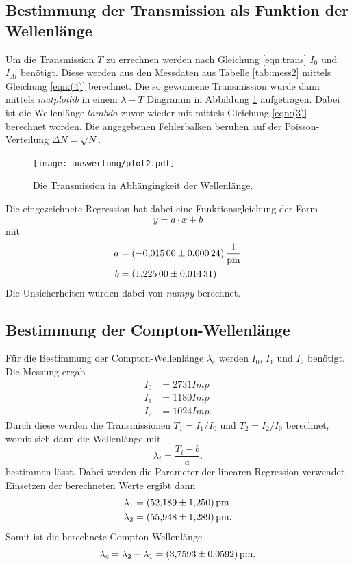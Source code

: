 \subsection{Bestimmung der Transmission als Funktion der Wellenlänge}
\label{sec:transmission}
Um die Transmission $T$ zu errechnen werden nach Gleichung \eqref{eqn:trans} $I_{0}$ und $I_{Al}$ benötigt. Diese werden aus den Messdaten
aus Tabelle \ref{tab:mess2} mittels Gleichung \eqref{eqn:(4)} berechnet. Die so gewonnene Transmission wurde dann mittels 
\textit{matplotlib} \cite{matplotlib} in einem $\lambda-T$ Diagramm in Abbildung \ref{fig:plot2} aufgetragen. Dabei ist die Wellenlänge
$lambda$ zuvor wieder mit mittels Gleichung \eqref{eqn:(3)} berechnet worden. Die angegebenen Fehlerbalken beruhen auf der Poisson-Verteilung
$\Delta N=\sqrt{N}$.
\begin{figure}[H]
    \centering
    \texttt{[image: auswertung/plot2.pdf]}
    \caption{Die Transmission in Abhängingkeit der Wellenlänge.}
    \label{fig:plot2}
\end{figure}
\noindent
Die eingezeichnete Regression hat dabei eine Funktionsgleichung der Form
  \begin{equation*}
      y=a\cdot x+b \label{eqn:gerade}
  \end{equation*} 
mit
  \begin{align*}
    a &= \SI{-0.015 \pm 0.00024}{\per\pico\metre}\\
    b &= \SI{1.225 \pm 0.01431}.
  \end{align*}
Die Unsicherheiten wurden dabei von  \textit{numpy} \cite{numpy} berechnet.

\subsection{Bestimmung der Compton-Wellenlänge}
\label{sec:compton}
Für die Bestimmung der Compton-Wellenlänge $\lambda_c$ werden $I_0$, $I_1$ und $I_2$ benötigt.
Die Messung ergab
\begin{align*}
    I_0 &= 2731 \si{Imp}\\
    I_1 &= 1180 \si{Imp}\\
    I_2 &= 1024 \si{Imp}.
\end{align*}  
Durch diese werden die Transmissionen $T_1=I_1/I_0$ und  $T_2=I_2/I_0$ berechnet, womit sich dann die Wellenlänge mit
\begin{equation*}
    \lambda_i = \frac{T_i -b}{a}. 
\end{equation*}
bestimmen lässt. Dabei werden die Parameter der linearen Regression verwendet.
Einsetzen der berechneten Werte ergibt dann
\begin{align*}
    \lambda_1 &= \SI{52.189 \pm 1.250}{\pico\metre}\\
    \lambda_2 &= \SI{55.948 \pm 1.289}{\pico\metre}.
\end{align*}
Somit ist die berechnete Compton-Wellenlänge
\begin{equation*}
    \lambda_c=\lambda_2-\lambda_1= \SI{3.7593 \pm 0.0592}{\pico\metre}.
\end{equation*}